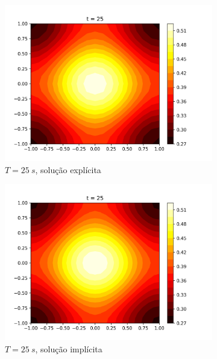 \documentclass{article}
\begin{document}
\begin{figure}
     \begin{subfigure}[b]{0.49\textwidth}
         \centering
         \includegraphics[width=\textwidth]{figs/q7a_heatmap_t25.png}
         \caption{$T=25~s$, solução explícita}
	\label{fig:q7a_heatmap_t25}
     \end{subfigure}
     \hfill
     \begin{subfigure}[b]{0.49\textwidth}
         \centering
     \includegraphics[width=\textwidth]{figs/q7b_heatmap_t25.png}
         \caption{$T=25~s$, solução implícita}
	\label{fig:q7b_heatmap_t25}
     \end{subfigure}
     \vfill
     \begin{subfigure}[b]{0.49\textwidth}

\end{subfigure}
\end{figure}
\end{document}
